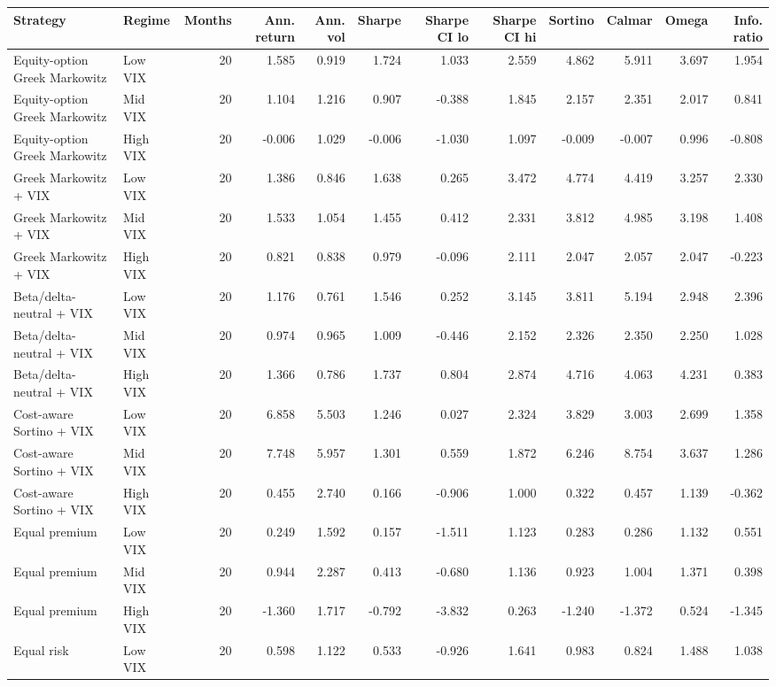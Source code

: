 \begin{tabular}{llrrrrrrrrrr}
\toprule
Strategy & Regime & Months & Ann. return & Ann. vol & Sharpe & Sharpe CI lo & Sharpe CI hi & Sortino & Calmar & Omega & Info. ratio \\
\midrule
Equity-option Greek Markowitz & Low VIX & 20 & 1.585 & 0.919 & 1.724 & 1.033 & 2.559 & 4.862 & 5.911 & 3.697 & 1.954 \\
Equity-option Greek Markowitz & Mid VIX & 20 & 1.104 & 1.216 & 0.907 & -0.388 & 1.845 & 2.157 & 2.351 & 2.017 & 0.841 \\
Equity-option Greek Markowitz & High VIX & 20 & -0.006 & 1.029 & -0.006 & -1.030 & 1.097 & -0.009 & -0.007 & 0.996 & -0.808 \\
Greek Markowitz + VIX & Low VIX & 20 & 1.386 & 0.846 & 1.638 & 0.265 & 3.472 & 4.774 & 4.419 & 3.257 & 2.330 \\
Greek Markowitz + VIX & Mid VIX & 20 & 1.533 & 1.054 & 1.455 & 0.412 & 2.331 & 3.812 & 4.985 & 3.198 & 1.408 \\
Greek Markowitz + VIX & High VIX & 20 & 0.821 & 0.838 & 0.979 & -0.096 & 2.111 & 2.047 & 2.057 & 2.047 & -0.223 \\
Beta/delta-neutral + VIX & Low VIX & 20 & 1.176 & 0.761 & 1.546 & 0.252 & 3.145 & 3.811 & 5.194 & 2.948 & 2.396 \\
Beta/delta-neutral + VIX & Mid VIX & 20 & 0.974 & 0.965 & 1.009 & -0.446 & 2.152 & 2.326 & 2.350 & 2.250 & 1.028 \\
Beta/delta-neutral + VIX & High VIX & 20 & 1.366 & 0.786 & 1.737 & 0.804 & 2.874 & 4.716 & 4.063 & 4.231 & 0.383 \\
Cost-aware Sortino + VIX & Low VIX & 20 & 6.858 & 5.503 & 1.246 & 0.027 & 2.324 & 3.829 & 3.003 & 2.699 & 1.358 \\
Cost-aware Sortino + VIX & Mid VIX & 20 & 7.748 & 5.957 & 1.301 & 0.559 & 1.872 & 6.246 & 8.754 & 3.637 & 1.286 \\
Cost-aware Sortino + VIX & High VIX & 20 & 0.455 & 2.740 & 0.166 & -0.906 & 1.000 & 0.322 & 0.457 & 1.139 & -0.362 \\
Equal premium & Low VIX & 20 & 0.249 & 1.592 & 0.157 & -1.511 & 1.123 & 0.283 & 0.286 & 1.132 & 0.551 \\
Equal premium & Mid VIX & 20 & 0.944 & 2.287 & 0.413 & -0.680 & 1.136 & 0.923 & 1.004 & 1.371 & 0.398 \\
Equal premium & High VIX & 20 & -1.360 & 1.717 & -0.792 & -3.832 & 0.263 & -1.240 & -1.372 & 0.524 & -1.345 \\
Equal risk & Low VIX & 20 & 0.598 & 1.122 & 0.533 & -0.926 & 1.641 & 0.983 & 0.824 & 1.488 & 1.038 \\

\end{tabular}
